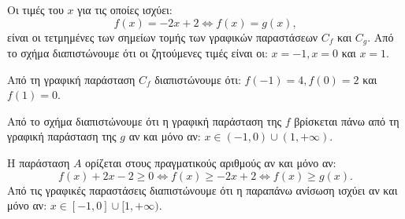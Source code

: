 
\begin{alist}
\item Οι τιμές του $x$ για τις οποίες ισχύει:
\[f(x) = -2x + 2 \Leftrightarrow f(x) = g(x),\]
είναι οι τετμημένες των σημείων τομής των γραφικών παραστάσεων $C_f$ και $C_g$. Από το
σχήμα διαπιστώνουμε ότι οι ζητούμενες τιμές είναι οι:
$x = -1, x = 0$ και $x = 1$.

\item Από τη γραφική παράσταση $C_f$ διαπιστώνουμε ότι:
$f(-1) = 4, f(0) = 2$ και $f(1) = 0$.

\item Από το σχήμα διαπιστώνουμε ότι η γραφική παράσταση της $f$ βρίσκεται πάνω από τη
γραφική παράσταση της $g$ αν και μόνο αν:
$x \in (-1, 0) \cup (1, +\infty)$.

\item Η παράσταση $A$ ορίζεται στους πραγματικούς αριθμούς αν και μόνο αν:
\[f(x) + 2x - 2 \ge 0 \Leftrightarrow f(x) \ge -2x + 2 \Leftrightarrow f(x) \ge g(x).\]
Από τις γραφικές παραστάσεις διαπιστώνουμε ότι η παραπάνω ανίσωση ισχύει αν και μόνο
αν:
$x \in [-1, 0] \cup [1, +\infty)$.
\end{alist}

